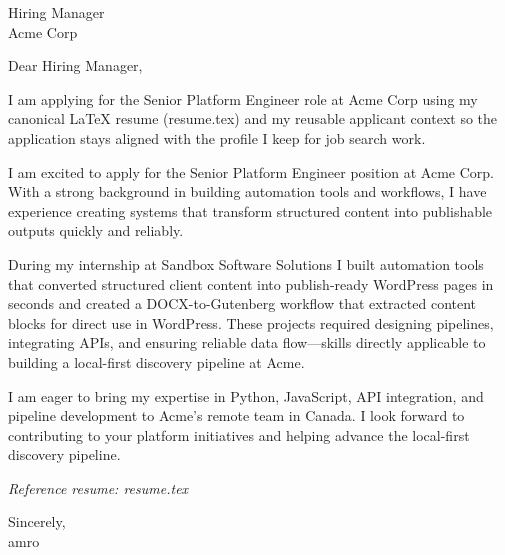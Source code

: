 \documentclass[11pt]{letter}
\begin{document}
\begin{letter}{Hiring Manager \\ Acme Corp}
\opening{Dear Hiring Manager,}

I am applying for the Senior Platform Engineer role at Acme Corp using my canonical LaTeX resume (resume.tex) and my reusable applicant context so the application stays aligned with the profile I keep for job search work.

I am excited to apply for the Senior Platform Engineer position at Acme Corp. With a strong background in building automation tools and workflows, I have experience creating systems that transform structured content into publishable outputs quickly and reliably.

During my internship at Sandbox Software Solutions I built automation tools that converted structured client content into publish-ready WordPress pages in seconds and created a DOCX-to-Gutenberg workflow that extracted content blocks for direct use in WordPress. These projects required designing pipelines, integrating APIs, and ensuring reliable data flow—skills directly applicable to building a local-first discovery pipeline at Acme.

I am eager to bring my expertise in Python, JavaScript, API integration, and pipeline development to Acme’s remote team in Canada. I look forward to contributing to your platform initiatives and helping advance the local-first discovery pipeline.



\noindent\emph{Reference resume: resume.tex}

\closing{Sincerely, \\ amro}
\end{letter}
\end{document}
